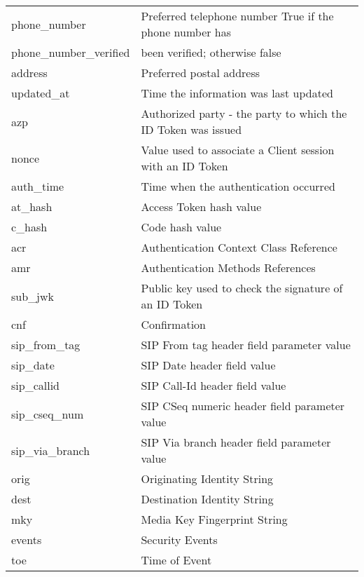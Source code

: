 {\begin{longtable}{||l|l|}
        phone\_number              & Preferred telephone number True if the phone number has\\
        phone\_number\_verified     & been verified; otherwise false\\
        address                   & Preferred postal address\\
        updated\_at                & Time the information was last updated\\
        azp                       & Authorized party - the party to which the ID Token was issued\\
        nonce                     & Value used to associate a Client session with an ID Token\\
        auth\_time                 & Time when the authentication occurred\\
        at\_hash                   & Access Token hash value\\
        c\_hash                    & Code hash value\\
        acr                       & Authentication Context Class Reference\\
        amr                       & Authentication Methods References\\
        sub\_jwk                   & Public key used to check the signature of an ID Token\\
        cnf                       & Confirmation\\
        sip\_from\_tag              & SIP From tag header field parameter value\\
        sip\_date                  & SIP Date header field value\\
        sip\_callid                & SIP Call-Id header field value\\
        sip\_cseq\_num              & SIP CSeq numeric header field parameter value\\
        sip\_via\_branch            & SIP Via branch header field parameter value\\
        orig                      & Originating Identity String\\
        dest                      & Destination Identity String\\
        mky                       & Media Key Fingerprint String\\
        events                    & Security Events\\
        toe                       & Time of Event\\

\end{longtable}}
